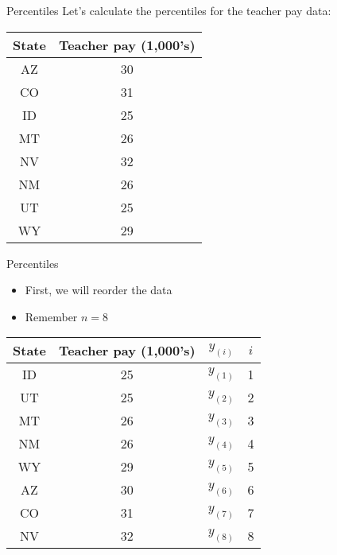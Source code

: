 \documentclass[xcolor=dvipsnames]{beamer}
\begin{document}
\begin{frame}{Percentiles}
	Let's calculate the percentiles for the teacher pay data:
		\begin{center}
		\begin{tabular}{|c|c|}
			\hline 
			\textbf{State} & \textbf{Teacher pay (1,000's)} \\ 
			\hline \hline
			AZ & 30 \\ \hline 
			CO &  31 \\ \hline 
			ID & 25  \\  \hline 
			MT &  26 \\ \hline 
			NV & 32 \\ \hline 
			NM &  26 \\ \hline 
			UT &  25 \\ \hline 
			WY &  29 \\ \hline 
		\end{tabular} 
	\end{center}
\end{frame}

\begin{frame}{Percentiles}
\begin{itemize}
	\item First, we will reorder the data
	\item Remember $n = 8$
\end{itemize}
	\begin{center}
		\begin{tabular}{|c|c|c|c|}
			\hline 
			\textbf{State} & \textbf{Teacher pay (1,000's)} & $y_{(i)}$ & $i$ \\ 
			\hline \hline 
			ID & 25 & $y_{(1)}$& 1 \\  \hline 
			UT &  25  & $y_{(2)}$& 2\\ \hline 
			MT &  26  & $y_{(3)}$& 3\\ \hline 
			NM &  26  & $y_{(4)}$& 4\\ \hline 
			WY &  29  & $y_{(5)}$& 5\\ \hline 
			AZ & 30  & $y_{(6)}$& 6\\ \hline 
			CO &  31 & $y_{(7)}$& 7\\ \hline
			NV & 32  & $y_{(8)}$& 8\\ \hline 
		\end{tabular} 
	\end{center}
\end{frame}
\end{document}
